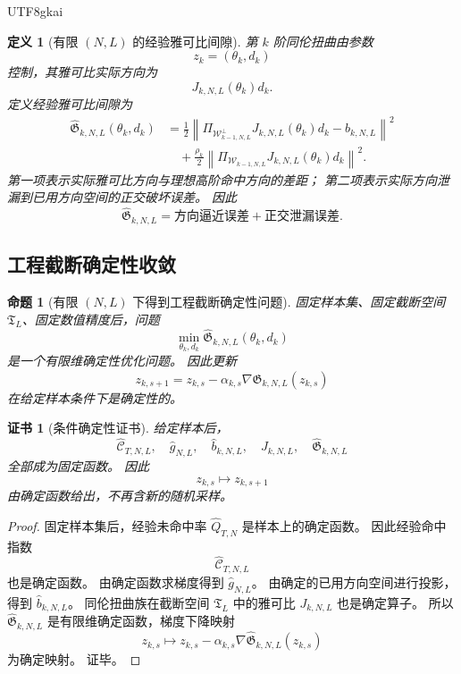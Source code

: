 \documentclass[12pt]{article}
\newtheorem{definition}{定义}[section]
\newtheorem{proposition}{命题}[section]
\newtheorem{Certificate}{证书}[section]
\begin{document}
\begin{CJK*}{UTF8}{gkai}
\begin{definition}[有限 \((N,L)\) 的经验雅可比间隙]
\label{def:tex55-engdet-empirical-jacobian-gap}
第 \(k\) 阶同伦扭曲由参数
\[
  z_k=(\theta_k,d_k)
\]
控制，其雅可比实际方向为
\[
  J_{k,N,L}(\theta_k)d_k.
\]
定义经验雅可比间隙为
\[
  \boxed{
  \begin{aligned}
  \widehat{\mathfrak G}_{k,N,L}(\theta_k,d_k)
  &=
  \frac12
  \left\lVert
  \Pi_{\mathcal W_{k-1,N,L}^{\perp}}
  J_{k,N,L}(\theta_k)d_k
  -
  \widehat b_{k,N,L}
  \right\rVert^2\\
  &\quad+
  \frac{\rho_k}{2}
  \left\lVert
  \Pi_{\mathcal W_{k-1,N,L}}
  J_{k,N,L}(\theta_k)d_k
  \right\rVert^2.
  \end{aligned}
  }
\]
第一项表示实际雅可比方向与理想高阶命中方向的差距；
第二项表示实际方向泄漏到已用方向空间的正交破坏误差。
因此
\[
  \boxed{
  \widehat{\mathfrak G}_{k,N,L}
  =
  \text{方向逼近误差}
  +
  \text{正交泄漏误差}.
  }
\]
\end{definition}

\subsection{工程截断确定性收敛}
\label{subsec:tex55-engdet-engineering}

\begin{proposition}[有限 \((N,L)\) 下得到工程截断确定性问题]
\label{prop:tex55-engdet-finite-deterministic}
固定样本集、固定截断空间 \(\mathfrak T_L\)、固定数值精度后，问题
\[
  \min_{\theta_k,d_k}
  \widehat{\mathfrak G}_{k,N,L}(\theta_k,d_k)
\]
是一个有限维确定性优化问题。
因此更新
\[
  z_{k,s+1}
  =
  z_{k,s}
  -
  \alpha_{k,s}
  \nabla\widehat{\mathfrak G}_{k,N,L}(z_{k,s})
\]
在给定样本条件下是确定性的。
\end{proposition}

\begin{Certificate}[条件确定性证书]
\label{cert:tex55-engdet-finite-deterministic}
给定样本后，
\[
  \widehat{\mathcal C}_{T,N,L},
  \quad
  \widehat g_{N,L},
  \quad
  \widehat b_{k,N,L},
  \quad
  J_{k,N,L},
  \quad
  \widehat{\mathfrak G}_{k,N,L}
\]
全部成为固定函数。
因此
\[
  z_{k,s}\mapsto z_{k,s+1}
\]
由确定函数给出，不再含新的随机采样。
\end{Certificate}

\begin{proof}
固定样本集后，经验未命中率 \(\widehat Q_{T,N}\) 是样本上的确定函数。
因此经验命中指数
\[
  \widehat{\mathcal C}_{T,N,L}
\]
也是确定函数。
由确定函数求梯度得到 \(\widehat g_{N,L}\)。
由确定的已用方向空间进行投影，得到 \(\widehat b_{k,N,L}\)。
同伦扭曲族在截断空间 \(\mathfrak T_L\) 中的雅可比 \(J_{k,N,L}\) 也是确定算子。
所以 \(\widehat{\mathfrak G}_{k,N,L}\) 是有限维确定函数，梯度下降映射
\[
  z_{k,s}\mapsto z_{k,s}-\alpha_{k,s}
  \nabla\widehat{\mathfrak G}_{k,N,L}(z_{k,s})
\]
为确定映射。
证毕。
\end{proof}


\end{CJK*}
\end{document}
